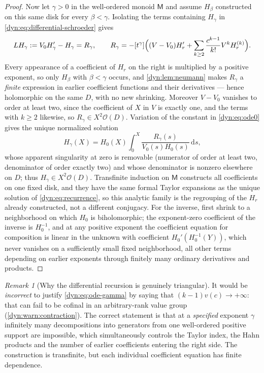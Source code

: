 \documentclass[11pt,letterpaper]{article}
\theoremstyle{definition}
\theoremstyle{remark}
\newtheorem{remark}[remark]{Remark}
\newcommand{\OO}{\mathcal O}
\newcommand{\dd}{\,\mathrm d}
\numberwithin{equation}{section}
\begin{document}
\begin{proof}
Now let $\gamma>0$ in the well-ordered monoid $\mathsf M$ and assume
$H_\beta$ constructed on this same disk for every $\beta<\gamma$.
Isolating the terms containing $H_\gamma$ in
\eqref{dyn:eq:differential-schroeder} gives
\begin{equation}\label{dyn:eq:ode-gamma}
 LH_\gamma:=V_0H_\gamma'-H_\gamma=R_\gamma,\qquad
 R_\gamma=-[t^{\gamma}]\Bigl((V-V_0)H_r'
 +\sum_{k\ge2}\frac{c^{k-1}}{k!}V^{k}H_r^{(k)}\Bigr).
\end{equation}
Every appearance of a coefficient of $H_r$ on the right is multiplied by a
positive exponent, so only $H_\beta$ with $\beta<\gamma$ occurs, and
\cref{dyn:lem:neumann} makes $R_\gamma$ a \emph{finite} expression in
earlier coefficient functions and their derivatives --- hence holomorphic
on the same $D$, with no new shrinking. Moreover $V-V_0$ vanishes to order
at least two, since the coefficient of $X$ in $V$ is exactly one, and the
terms with $k\ge2$ likewise, so $R_\gamma\in X^{2}\OO(D)$. Variation of the
constant in \eqref{dyn:eq:ode0} gives the unique normalized solution
\begin{equation}\label{dyn:eq:gamma-integral}
 H_\gamma(X)=H_0(X)\int_0^{X}\frac{R_\gamma(s)}{V_0(s)H_0(s)}\dd s ,
\end{equation}
whose apparent singularity at zero is removable (numerator of order at
least two, denominator of order exactly two) and whose denominator is
nonzero elsewhere on $D$; thus $H_\gamma\in X^{2}\OO(D)$. Transfinite
induction on $\mathsf M$ constructs all coefficients on one fixed disk, and
they have the same formal Taylor expansions as the unique solution of
\eqref{dyn:eq:recurrence}, so this analytic family is the regrouping of the
$H_r$ already constructed, not a different conjugacy. For the inverse,
first shrink to a neighborhood on which $H_0$ is biholomorphic; the
exponent-zero coefficient of the inverse is $H_0^{-1}$, and at any positive
exponent the coefficient equation for composition is linear in the unknown
with coefficient $H_0'(H_0^{-1}(Y))$, which never vanishes on a
sufficiently small fixed neighborhood, all other terms depending on earlier
exponents through finitely many ordinary derivatives and products.
\end{proof}

\begin{remark}[Why the differential recursion is genuinely triangular]
\label{dyn:rem:triangular}
It would be \emph{incorrect} to justify \eqref{dyn:eq:ode-gamma} by saying
that $(k-1)v(c)\to+\infty$: that can fail to be cofinal in an
arbitrary-rank value group (\cref{dyn:warn:contraction}). The correct
statement is that at a \emph{specified} exponent $\gamma$ infinitely many
decompositions into generators from one well-ordered positive support are
impossible, which simultaneously controls the Taylor index, the Hahn
products and the number of earlier coefficients entering the right side.
The construction is transfinite, but each individual coefficient equation
has finite dependence.
\end{remark}
\end{document}

